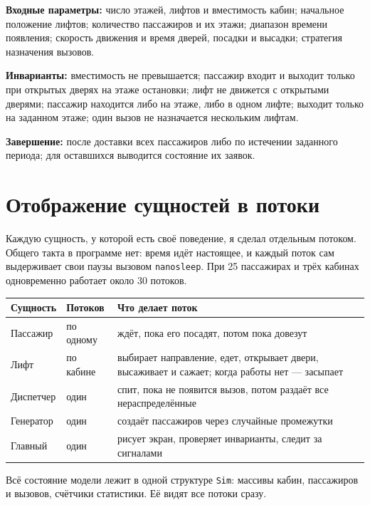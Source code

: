 \documentclass[12pt,a4paper]{article}
\begin{document}
\textbf{Входные параметры:} число этажей, лифтов и вместимость кабин;
начальное положение лифтов; количество пассажиров и их этажи; диапазон
времени появления; скорость движения и время дверей, посадки и высадки;
стратегия назначения вызовов.

\textbf{Инварианты:} вместимость не превышается; пассажир входит и выходит
только при открытых дверях на этаже остановки; лифт не движется с
открытыми дверями; пассажир находится либо на этаже, либо в одном лифте;
выходит только на заданном этаже; один вызов не назначается нескольким
лифтам.

\textbf{Завершение:} после доставки всех пассажиров либо по истечении
заданного периода; для оставшихся выводится состояние их заявок.

\section{Отображение сущностей в потоки}

Каждую сущность, у которой есть своё поведение, я сделал отдельным
потоком. Общего такта в программе нет: время идёт настоящее, и каждый
поток сам выдерживает свои паузы вызовом \verb|nanosleep|. При 25
пассажирах и трёх кабинах одновременно работает около 30 потоков.

\begin{center}
\begin{tabular}{@{}p{26mm}p{20mm}p{89mm}@{}}
\textbf{Сущность} & \textbf{Потоков} & \textbf{Что делает поток} \\
\hline
Пассажир & по одному & ждёт, пока его посадят, потом пока довезут \\
Лифт & по кабине & выбирает направление, едет, открывает двери,
высаживает и сажает; когда работы нет --- засыпает \\
Диспетчер & один & спит, пока не появится вызов, потом раздаёт все
нераспределённые \\
Генератор & один & создаёт пассажиров через случайные промежутки \\
Главный & один & рисует экран, проверяет инварианты, следит за сигналами \\
\hline
\end{tabular}
\end{center}

Всё состояние модели лежит в одной структуре \verb|Sim|: массивы кабин,
пассажиров и вызовов, счётчики статистики. Её видят все потоки сразу.
\end{document}
